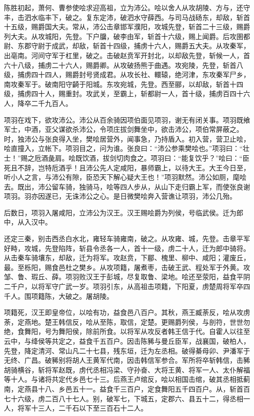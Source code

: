 \documentclass[12pt,UTF8]{ctexbook}
\begin{document}
陈胜初起，萧何、曹参使哙求迎高祖，立为沛公。哙以舍人从攻胡陵、方与，还守丰，击泗水临丰下，破之。复东定沛，破泗水守薛西。与司马战砀东，却敌，斩首十五级，赐爵国大夫。常从，沛公击章邯军濮阳，攻城先登，斩首二十三级，赐爵列大夫。从攻城阳，先登。下户牖，破李由军，斩首十六级，赐上闻爵。后攻圉都尉、东郡守尉于成武，却敌，斩首十四级，捕虏十六人，赐爵五大夫。从攻秦军，出亳南。河间守军于杠里，破之。击破赵贲军开封北，以却敌先登，斩候一人，首六十八级，捕虏二十六人，赐爵卿。从攻破扬熊于曲遇。攻宛陵，先登，斩首八级，捕虏四十四人，赐爵封号贤成君。从攻长社、轘辕，绝河津，东攻秦军尸乡，南攻秦军于。破南阳守齮于阳城。东攻宛城，先登。西至郦，以却敌，斩首十四级，捕虏四十人，赐重封。攻武关，至霸上，斩都尉一人，首十级，捕虏百四十六人，降卒二千九百人。



项羽在戏下，欲攻沛公。沛公从百余骑因项伯面见项羽，谢无有闭关事。项羽既飨军士，中酒，亚父谋欲杀沛公，令项庄拔剑舞坐中，欲击沛公，项伯常屏蔽之。时，独沛公与张良得入坐，樊哙居营外，闻事急，乃持盾入。初入营，营卫止哙，哙直撞入，立帐下。项羽目之，问为谁。张良曰：“沛公参乘樊哙也。”项羽曰：“壮士！”赐之卮酒彘肩。哙既饮酒，拔剑切肉食之。项羽曰：“能复饮乎？”哙曰：“臣死且不辞，岂特卮酒乎！且沛公先人定咸阳，暴师霸上，以待大王。大王今日至，听小人之言，与沛公有隙，臣恐天下解心疑大王也！”项羽默然。沛公如厕，麾哙去。既出，沛公留车骑，独骑马，哙等四人步从，从山下走归霸上军，而使张良谢项羽。羽亦因遂已，无诛沛公之心。是日微樊哙奔入营谯让项羽，沛公几殆。



后数日，项羽入屠咸阳，立沛公为汉王。汉王赐哙爵为列侯，号临武侯。迁为郎中，从入汉中。



还定三秦，别击西丞白水北，雍轻车骑雍南，破之。从攻雍、城，先登。击章平军好畤，攻城，先登陷阵，斩县令丞各一人，首十一级，虏二十人，迁为郎中骑将。从击秦车骑壤东，却敌，迁为将军。攻赵贲，下郿、槐里、柳中、咸阳；灌废丘，最。至栎阳，赐食邑杜之樊乡。从攻项籍，屠煮枣，击破王武、程处军于外黄。攻邹、鲁、瑕丘、薛。项羽败汉王于彭城，尽复取鲁、梁地。哙还至荥阳，益食平阴二千户，以将军守广武一岁。项羽引东，从高祖击项籍，下阳夏，虏楚周将军卒四千人。围项籍陈，大破之。屠胡陵。



项籍死，汉王即皇帝位，以哙有功，益食邑八百户。其秋，燕王臧荼反，哙从攻虏荼，定燕地。楚王韩信反，哙从至陈，取信，定楚。更赐爵列侯，与剖符，世世勿绝，食舞阳，号为舞阳侯，除前所食。以将军从攻反者韩王信于代。自霍人以往至云中，与绛侯等共定之，益食千五百户。因击陈豨与曼丘臣军，战襄国，破柏人，先登，降定清河、常山凡二十七县，残东垣，迁为左丞相。破得綦母卯、尹潘军于无终、广昌。破豨别将胡人王黄军代南，因击韩信军参合。军所将卒斩韩信，击豨胡骑横谷，斩将军赵既，虏代丞相冯梁、守孙奋、大将王黄、将军一人、太仆解福等十人。与诸将共定代乡邑七十三。后燕王卢绾反，哙以相国击绾，破其丞相抵蓟南，定燕县十八、乡邑五十一。益食千三百户，定食舞阳五千四百户。从，斩首百七十六级，虏二百八十七人。别，破军七，下城五，定郡六、县五十二，得丞相一人，将军十三人，二千石以下至三百石十二人。
\end{document}
